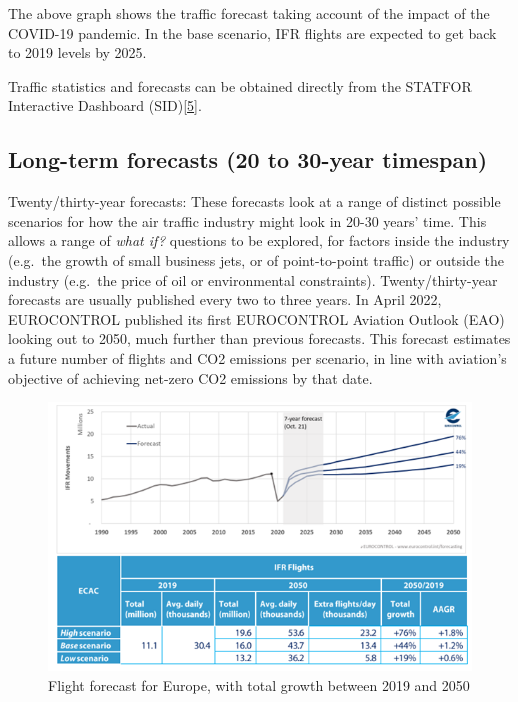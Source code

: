 \documentclass[
  11pt,
  a4paper,
]{book}
\begin{document}
The above graph shows the traffic forecast taking account of the impact
of the COVID-19 pandemic. In the base scenario, IFR flights are expected
to get back to 2019 levels by 2025.

Traffic statistics and forecasts can be obtained directly from the
STATFOR Interactive Dashboard
(SID)\protect\hyperlink{ref-ectrl:statfor:sid}{{[}5{]}}.

\hypertarget{long-term-forecasts-20-to-30-year-timespan}{%
\subsection{Long-term forecasts (20 to 30-year
timespan)}\label{long-term-forecasts-20-to-30-year-timespan}}

Twenty/thirty-year forecasts: These forecasts look at a range of
distinct possible scenarios for how the air traffic industry might look
in 20-30 years' time. This allows a range of \emph{what if?} questions
to be explored, for factors inside the industry (e.g.~the growth of
small business jets, or of point-to-point traffic) or outside the
industry (e.g.~the price of oil or environmental constraints).
Twenty/thirty-year forecasts are usually published every two to three
years. In April 2022, EUROCONTROL published its first EUROCONTROL
Aviation Outlook (EAO) looking out to 2050, much further than previous
forecasts. This forecast estimates a future number of flights and CO2
emissions per scenario, in line with aviation's objective of achieving
net-zero CO2 emissions by that date.

\begin{figure}

{\centering \includegraphics{chapters/../figures/eao_2050_flights_base_scenario.png}

}

\caption{\label{fig-Forecast-2050-plot}Flight forecast for Europe, with
total growth between 2019 and 2050}

\end{figure}
\end{document}
